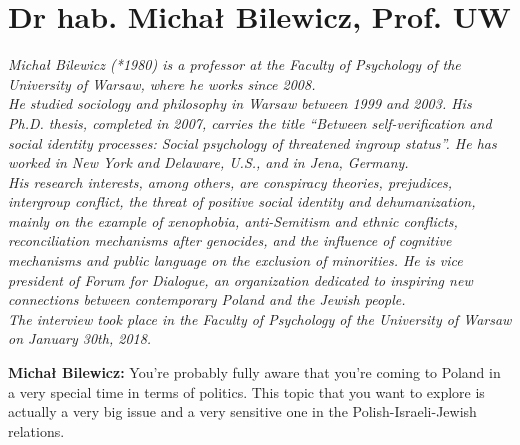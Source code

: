 \section{Dr hab. Michał Bilewicz, Prof. UW}

\textit{Michał Bilewicz (*1980) is a professor at the Faculty of Psychology of the University of Warsaw, where he works since 2008. \\
He studied sociology and philosophy in Warsaw between 1999 and 2003. His Ph.D. thesis, completed in 2007, carries the title "`Between self-verification and social identity processes: Social psychology of threatened ingroup status"'. 
He has worked in New York and Delaware, U.S., and in Jena, Germany. \\
His research interests, among others, are conspiracy theories, prejudices, intergroup conflict, the threat of positive social identity and dehumanization, mainly on the example of xenophobia, anti-Semitism and ethnic conflicts, reconciliation mechanisms after genocides, and the influence of cognitive mechanisms and public language on the exclusion of minorities.
He is vice president of Forum for Dialogue, an organization dedicated to inspiring new connections between contemporary Poland and the Jewish people. \\
The interview took place in the Faculty of Psychology of the University of Warsaw on January 30th, 2018.}\par
\vspace*{2em}
\textbf{Michał Bilewicz:} You're probably fully aware that you're coming to Poland in a very special time in terms of politics. This topic that you want to explore is actually a very big issue and a very sensitive one in the Polish-Israeli-Jewish relations.\\
